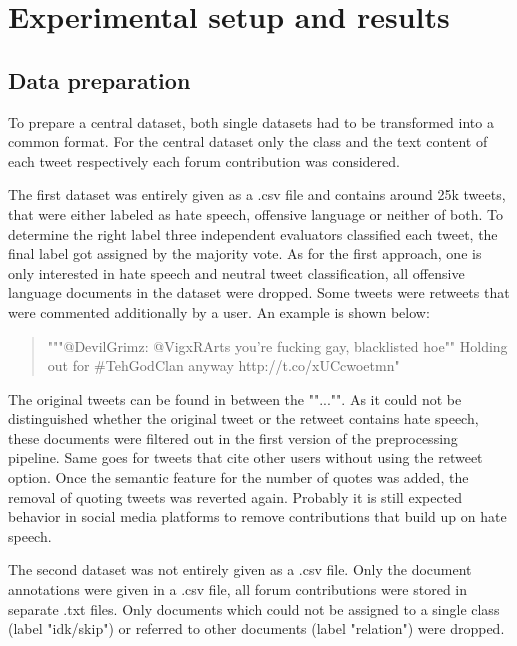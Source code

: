 \section{Experimental setup and results} \label{results}

\subsection{Data preparation}

To prepare a central dataset, both single datasets had to be transformed into a common format. For the central dataset only the class and the text content of each tweet respectively each forum contribution was considered.

The first dataset  was entirely given as a .csv file and contains around 25k tweets, that were either labeled as hate speech, offensive language or neither of both. To determine the right label three independent evaluators classified each tweet, the final label got assigned by the majority vote. As for the first approach, one is only interested in hate speech and neutral tweet classification, all offensive language documents in the dataset were dropped. Some tweets were retweets that were commented additionally by a user. An example is shown below:

\begin{quote}
    """@DevilGrimz: @VigxRArts you're fucking gay, blacklisted hoe"" Holding out for \#TehGodClan anyway http://t.co/xUCcwoetmn"
\end{quote}

The original tweets can be found in between the ""..."". As it could not be distinguished whether the original tweet or the retweet contains hate speech, these documents were filtered out in the first version of the preprocessing pipeline. Same goes for tweets that cite other users without using the retweet option. Once the semantic feature for the number of quotes was added, the removal of quoting tweets was reverted again. Probably it is still expected behavior in social media platforms to remove contributions that build up on hate speech. 

The second dataset  was not entirely given as a .csv file. Only the document annotations were given in a .csv file, all forum contributions were stored in separate .txt files. Only documents which could not be assigned to a single class (label "idk/skip") or referred to other documents (label "relation") were dropped.

